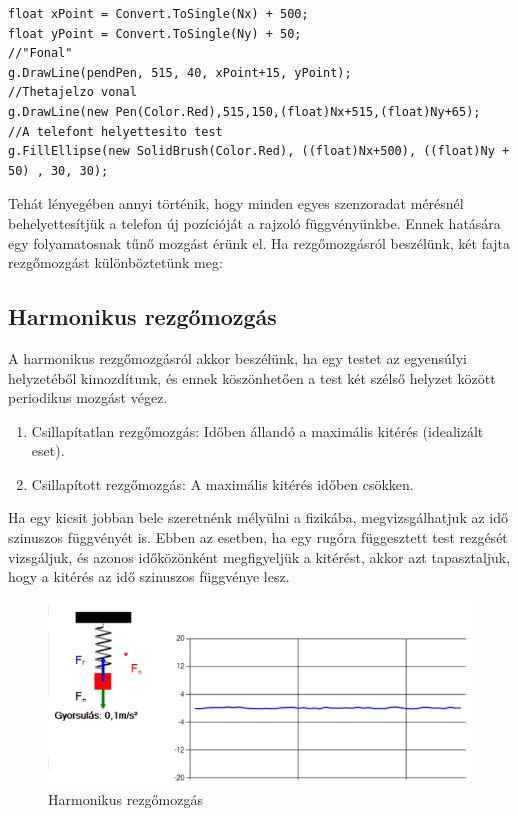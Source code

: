 \documentclass{thesis-ekf}
\theoremstyle{definition}
\theoremstyle{remark}
\begin{document}
 \begin{lstlisting}
float xPoint = Convert.ToSingle(Nx) + 500;
float yPoint = Convert.ToSingle(Ny) + 50;
//"Fonal"
g.DrawLine(pendPen, 515, 40, xPoint+15, yPoint);
//Thetajelzo vonal
g.DrawLine(new Pen(Color.Red),515,150,(float)Nx+515,(float)Ny+65);
//A telefont helyettesito test
g.FillEllipse(new SolidBrush(Color.Red), ((float)Nx+500), ((float)Ny + 50) , 30, 30);
 \end{lstlisting}
 \par Tehát lényegében annyi történik, hogy minden egyes szenzoradat mérésnél behelyettesítjük a telefon új pozícióját a rajzoló függvényünkbe. Ennek hatására egy folyamatosnak tűnő mozgást érünk el. Ha rezgőmozgásról beszélünk, két fajta rezgőmozgást különböztetünk meg:
\subsection{Harmonikus rezgőmozgás}
A harmonikus rezgőmozgásról akkor beszélünk, ha egy testet az egyensúlyi helyzetéből kimozdítunk, és ennek köszönhetően a test két szélső helyzet között periodikus mozgást végez.
\begin{enumerate}
	\item Csillapítatlan rezgőmozgás: Időben állandó a maximális kitérés (idealizált eset).
	\item Csillapított rezgőmozgás: A maximális kitérés időben csökken.
\end{enumerate}
\par Ha egy kicsit jobban bele szeretnénk mélyülni a fizikába, megvizsgálhatjuk az idő szinuszos függvényét is. Ebben az esetben, ha egy rugóra függesztett test rezgését vizsgáljuk, és azonos időközönként megfigyeljük a kitérést, akkor azt tapasztaljuk, hogy a kitérés az idő szinuszos függvénye lesz.
\begin{figure}[!h]
	\centering
	\includegraphics[width=15cm]{harmonikus}
	\caption{Harmonikus rezgőmozgás}\label{harmonikus}
\end{figure}
\end{document}
